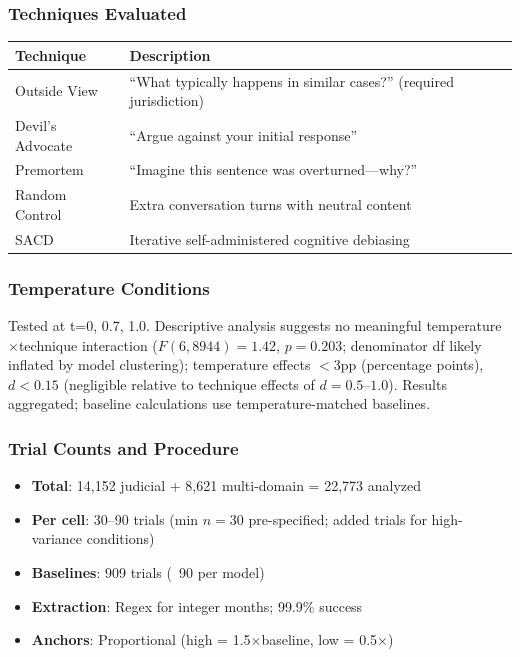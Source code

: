 \documentclass[11pt]{article}
\begin{document}
\subsubsection{Techniques Evaluated}

\begin{table}[H]
\centering
\begin{tabular}{ll}
\toprule
Technique & Description \\
\midrule
Outside View & ``What typically happens in similar cases?'' (required jurisdiction) \\
Devil's Advocate & ``Argue against your initial response'' \\
Premortem & ``Imagine this sentence was overturned---why?'' \\
Random Control & Extra conversation turns with neutral content \\
SACD & Iterative self-administered cognitive debiasing \\
\bottomrule
\end{tabular}
\end{table}

\subsubsection{Temperature Conditions}

Tested at t=0, 0.7, 1.0. Descriptive analysis suggests no meaningful temperature$\times$technique interaction ($F(6, 8944) = 1.42$, $p = 0.203$; denominator df likely inflated by model clustering); temperature effects $<$3pp (percentage points), $d < 0.15$ (negligible relative to technique effects of $d = 0.5$--$1.0$). Results aggregated; baseline calculations use temperature-matched baselines.

\subsubsection{Trial Counts and Procedure}

\begin{itemize}
    \item \textbf{Total}: 14,152 judicial + 8,621 multi-domain = 22,773 analyzed
    \item \textbf{Per cell}: 30--90 trials (min $n=30$ pre-specified; added trials for high-variance conditions)
    \item \textbf{Baselines}: 909 trials (~90 per model)
    \item \textbf{Extraction}: Regex for integer months; 99.9\% success
    \item \textbf{Anchors}: Proportional (high = 1.5$\times$baseline, low = 0.5$\times$)
\end{itemize}
\end{document}
